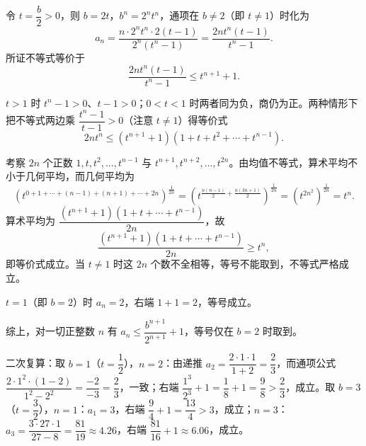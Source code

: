 \begin{answer}
令 $t=\dfrac b2>0$，则 $b=2t$，$b^n=2^nt^n$，通项在 $b\ne2$（即 $t\ne1$）时化为
\nopagebreak[4]
\[a_n=\frac{n\cdot2^nt^n\cdot2(t-1)}{2^n\left(t^n-1\right)}=\frac{2nt^n(t-1)}{t^n-1}.\]
所证不等式等价于
\nopagebreak[4]
\[\frac{2nt^n(t-1)}{t^n-1}\leqslant t^{n+1}+1.\]

$t>1$ 时 $t^n-1>0$、$t-1>0$；$0<t<1$ 时两者同为负，商仍为正。两种情形下把不等式两边乘 $\dfrac{t^n-1}{t-1}>0$（注意 $t\ne1$）得等价式
\nopagebreak[4]
\[2nt^n\leqslant\left(t^{n+1}+1\right)\left(1+t+t^2+\cdots+t^{n-1}\right).\]

考察 $2n$ 个正数 $1,t,t^2,\dots,t^{n-1}$ 与 $t^{n+1},t^{n+2},\dots,t^{2n}$。由均值不等式，算术平均不小于几何平均，而几何平均为
\nopagebreak[4]
\[\left(t^{0+1+\cdots+(n-1)+(n+1)+\cdots+2n}\right)^{\frac{1}{2n}}=\left(t^{\frac{n(n-1)}{2}+\frac{n(3n+1)}{2}}\right)^{\frac{1}{2n}}=\left(t^{2n^2}\right)^{\frac{1}{2n}}=t^n.\]
算术平均为 $\dfrac{\left(t^{n+1}+1\right)\left(1+t+\cdots+t^{n-1}\right)}{2n}$，故
\nopagebreak[4]
\[\frac{\left(t^{n+1}+1\right)\left(1+t+\cdots+t^{n-1}\right)}{2n}\geqslant t^n,\]
即等价式成立。当 $t\ne1$ 时这 $2n$ 个数不全相等，等号不能取到，不等式严格成立。

$t=1$（即 $b=2$）时 $a_n=2$，右端 $1+1=2$，等号成立。

综上，对一切正整数 $n$ 有 $a_n\leqslant\dfrac{b^{n+1}}{2^{n+1}}+1$，等号仅在 $b=2$ 时取到。

二次复算：取 $b=1$（$t=\dfrac12$），$n=2$：由递推 $a_2=\dfrac{2\cdot1\cdot1}{1+2}=\dfrac23$，而通项公式 $\dfrac{2\cdot1^2\cdot(1-2)}{1^2-2^2}=\dfrac{-2}{-3}=\dfrac23$，一致；右端 $\dfrac{1^3}{2^3}+1=\dfrac{1}{8}+1=\dfrac98>\dfrac23$，成立。取 $b=3$（$t=\dfrac32$），$n=1$：$a_1=3$，右端 $\dfrac94+1=\dfrac{13}{4}>3$，成立；$n=3$：$a_3=\dfrac{3\cdot27\cdot1}{27-8}=\dfrac{81}{19}\approx4.26$，右端 $\dfrac{81}{16}+1\approx6.06$，成立。



\end{answer}
